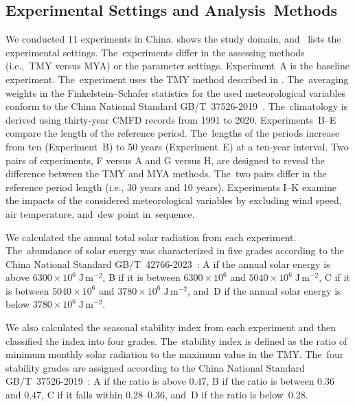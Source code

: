 \documentclass[atmosphere,article,accept,pdftex,moreauthors]{Definitions/mdpi}
\begin{document}
\subsection{Experimental Settings and Analysis~Methods}\label{sec:datamethods:experiments}

We conducted 11 experiments in China.  shows the study domain, and~ lists the experimental settings. The~experiments differ in the assessing methods (\mbox{i.e., TMY} versus MYA) or the parameter settings. Experiment~A is the baseline experiment. The~experiment uses the TMY method described in . The~averaging weights in the Finkelstein--Schafer statistics for the used meteorological variables conform to the China National Standard GB/T~37526-2019~\cite{GBT37525-2019}. The~climatology is derived using thirty-year CMFD records from 1991 to 2020. Experiments~B--E compare the length of the reference period. The~lengths of the periods increase from ten (Experiment~B) to 50 years (Experiment~E) at a ten-year interval. Two pairs of experiments, F versus A and G versus H, are designed to reveal the difference between the TMY and MYA methods. The~two pairs differ in the reference period length (i.e., 30 years and 10 years). Experiments I--K examine the impacts of the considered meteorological variables by excluding wind speed, air temperature, and~dew point in~sequence.

We calculated the annual total solar radiation from each experiment. The~abundance of solar energy was characterized in five grades according to the China National Standard GB/T~42766-2023~\cite{GBT42766-2023}: A if the annual solar energy is above \(6300\times10^6\;\mathrm{J\,m^{-2}}\), B if it is between \(6300\times10^6\) and \(5040\times10^6\;\mathrm{J\,m^{-2}}\), C if it is between \(5040\times10^6\) and \(3780\times10^6\;\mathrm{J\,m^{-2}}\), and~D if the annual solar energy is below \(3780\times10^6\;\mathrm{J\,m^{-2}}\).

We also calculated the seasonal stability index from each experiment and then classified the index into four grades. The~stability index is defined as the ratio of minimum monthly solar radiation to the maximum value in the TMY. The~four stability grades are assigned according to the China National Standard GB/T~37526-2019~\cite{GBT37525-2019}: A if the ratio is above 0.47, B if the ratio is between 0.36 and 0.47, C if it falls within 0.28--0.36, and~D if the ratio is below~0.28.
\end{document}

